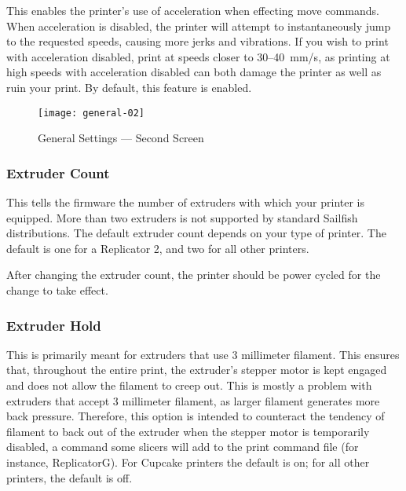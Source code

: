 This enables the printer's use of acceleration when effecting move commands.  When acceleration is disabled, the printer will attempt to instantaneously jump to the requested speeds, causing more jerks and vibrations.  If you wish to print with acceleration disabled, print at speeds closer to 30--40~mm/s, as printing at high speeds with acceleration disabled can both damage the printer as well as ruin your print.  By default, this feature is enabled.

 \begin{figure}[!htbp]
  \centering
    \texttt{[image: general-02]}
    \caption{General Settings --- Second Screen}
  \label{fig:gen2}
\end{figure}


\subsubsection{Extruder Count} \label{sec:extruder-count}

This tells the firmware the number of extruders with which your printer is equipped.  More than two extruders is not supported by standard Sailfish distributions.  The default extruder count depends on your type of printer.  The default is one for a Replicator 2, and two for all other printers.

After changing the extruder count, the printer should be power cycled for the change to take effect.


\subsubsection{Extruder Hold} \label{sec:extruder-hold}

This is primarily meant for extruders that use 3 millimeter filament.  This ensures that, throughout the entire print, the extruder's stepper motor is kept engaged and does not allow the filament to creep out.  This is mostly a problem with extruders that accept 3 millimeter filament, as larger filament generates more back pressure.  Therefore, this option is intended to counteract the tendency of filament to back out of the extruder when the stepper motor is temporarily disabled, a command some \glspl{slicer} will add to the print command file (for instance, ReplicatorG).  For Cupcake printers the default is on; for all other printers, the default is off.

